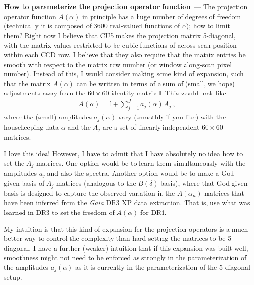 \documentclass[11pt]{article}
\renewcommand{\paragraph}[1]{\medskip\par\noindent\textbf{#1}~---}
\begin{document}
\paragraph{How to parameterize the projection operator function}
The projection operator function $A(\alpha)$ in principle has a huge number of degrees of freedom (technically it is composed of 3600 real-valued functions of $\alpha$); how to limit them?
Right now I believe that CU5 makes the projection matrix 5-diagonal, with the matrix values restricted to be cubic functions of across-scan position within each CCD row.
I believe that they also require that the matrix entries be smooth with respect to the matrix row number (or window along-scan pixel number).
Instead of this, I would consider making some kind of expansion, such that the matrix $A(\alpha)$ can be written in terms of a sum of (small, we hope) adjustments away from the $60\times 60$ identity matrix $\mathbb{I}$.
This would look like
\begin{align}
    A(\alpha) = \mathbb{I} + \sum_{j=1}^J a_j(\alpha)\,A_j~,
\end{align}
where the (small) amplitudes $a_j(\alpha)$ vary (smoothly if you like) with the housekeeping data $\alpha$ and the $A_j$ are a set of linearly independent $60\times 60$ matrices.

I love this idea!
However, I have to admit that I have absolutely no idea how to set the $A_j$ matrices.
One option would be to learn them simultaneously with the amplitudes $a_j$ and also the spectra.
Another option would be to make a God-given basis of $A_j$ matrices (analogous to the $B(\delta)$ basis), where that God-given basis is designed to capture the observed variation in the $A(\alpha_n)$ matrices that have been inferred from the \textsl{Gaia} DR3 XP data extraction.
That is, use what was learned in DR3 to set the freedom of $A(\alpha)$ for DR4.

My intuition is that this kind of expansion for the projection operators is a much better way to control the complexity than hard-setting the matrices to be 5-diagonal.
I have a further (weaker) intuition that if this expansion was built well, smoothness might not need to be enforced as strongly in the parameterization of the amplitudes $a_j(\alpha)$ as it is currently in the parameterization of the 5-diagonal setup.
\end{document}
